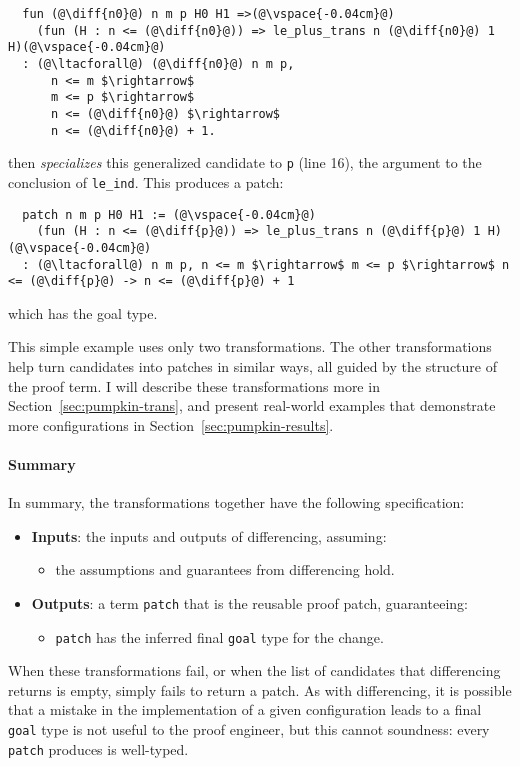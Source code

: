 \begin{lstlisting}
  fun (@\diff{n0}@) n m p H0 H1 =>(@\vspace{-0.04cm}@)
    (fun (H : n <= (@\diff{n0}@)) => le_plus_trans n (@\diff{n0}@) 1 H)(@\vspace{-0.04cm}@)
  : (@\ltacforall@) (@\diff{n0}@) n m p,
      n <= m $\rightarrow$
      m <= p $\rightarrow$
      n <= (@\diff{n0}@) $\rightarrow$
      n <= (@\diff{n0}@) + 1.
\end{lstlisting}
\sysname then \textit{specializes} this generalized candidate to \lstinline{p} (line 16), the argument
to the conclusion of \lstinline{le_ind}. This produces a patch:

\begin{lstlisting}
  patch n m p H0 H1 := (@\vspace{-0.04cm}@)
    (fun (H : n <= (@\diff{p}@)) => le_plus_trans n (@\diff{p}@) 1 H)(@\vspace{-0.04cm}@)
  : (@\ltacforall@) n m p, n <= m $\rightarrow$ m <= p $\rightarrow$ n <= (@\diff{p}@) -> n <= (@\diff{p}@) + 1
\end{lstlisting}
which has the goal type.

This simple example uses only two transformations.
The other transformations help turn candidates into patches in similar ways, all guided by
the structure of the proof term.
I will describe these transformations more in Section~\ref{sec:pumpkin-trans},
and present real-world examples that demonstrate more configurations in Section~\ref{sec:pumpkin-results}.

\paragraph{Summary}
In summary, the transformations together have the following specification:

\begin{itemize}
\item \textbf{Inputs}: the inputs and outputs of differencing, assuming:
\begin{itemize}
\item the assumptions and guarantees from differencing hold.
\end{itemize}
\item \textbf{Outputs}: a term \lstinline{patch} that is the reusable proof patch, guaranteeing:
\begin{itemize}
\item \lstinline{patch} has the inferred final \lstinline{goal} type for the change.
\end{itemize}
\end{itemize}
When these transformations fail, or when the list of candidates that differencing returns is empty,
\sysname simply fails to return a patch.
As with differencing, it is possible that a mistake in the implementation of a given configuration
leads to a final \lstinline{goal} type is not useful to the proof engineer,
but this cannot soundness:
every \lstinline{patch} \toolname produces is well-typed.

